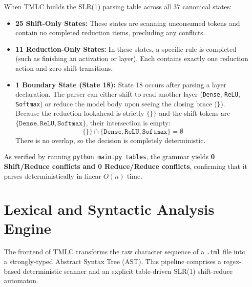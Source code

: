 \documentclass[11pt,a4paper]{article}
\begin{document}
When TMLC builds the SLR(1) parsing table across all 37 canonical states:
\begin{itemize}[leftmargin=*]
    \item \textbf{25 Shift-Only States:} These states are scanning unconsumed tokens and contain no completed reduction items, precluding any conflicts.
    \item \textbf{11 Reduction-Only States:} In these states, a specific rule is completed (such as finishing an activation or layer). Each contains exactly one reduction action and zero shift transitions.
    \item \textbf{1 Boundary State (State 18):} State 18 occurs after parsing a layer declaration. The parser can either shift to read another layer (\texttt{Dense}, \texttt{ReLU}, \texttt{Softmax}) or reduce the model body upon seeing the closing brace (\texttt{\}}). Because the reduction lookahead is strictly $\{\texttt{\}}\}$ and the shift tokens are $\{\texttt{Dense}, \texttt{ReLU}, \texttt{Softmax}\}$, their intersection is empty:
    $$\{\texttt{\}}\} \cap \{\texttt{Dense}, \texttt{ReLU}, \texttt{Softmax}\} = \emptyset$$
    There is no overlap, so the decision is completely deterministic.
\end{itemize}

As verified by running \texttt{python main.py tables}, the grammar yields \textbf{0 Shift/Reduce conflicts and 0 Reduce/Reduce conflicts}, confirming that it parses deterministically in linear $O(n)$ time.

\section{Lexical and Syntactic Analysis Engine}
\label{sec:lex_parse}

The frontend of TMLC transforms the raw character sequence of a \texttt{.tml} file into a strongly-typed Abstract Syntax Tree (AST). This pipeline comprises a regex-based deterministic scanner and an explicit table-driven SLR(1) shift-reduce automaton.
\end{document}
